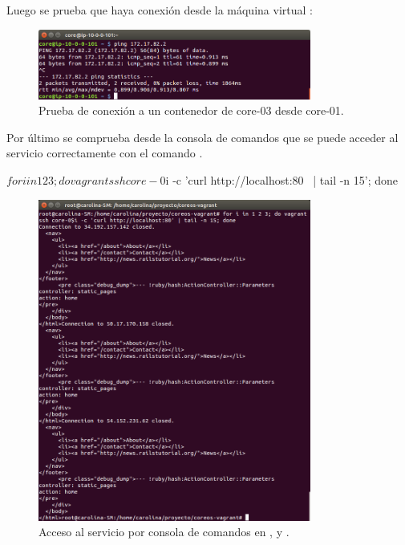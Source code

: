 Luego se prueba que haya conexión desde la máquina virtual :

\begin{figure}[H]
\centering
\includegraphics[width=0.8\textwidth]{images/figures/ping-1.png}
\caption{Prueba de conexión a un contenedor de core-03 desde core-01.}
\end{figure}

Por último se comprueba desde la consola de comandos que se puede acceder al servicio correctamente con el comando . 

\begin{code}
$ for i in 1 2 3; do vagrant ssh core-0$i -c 'curl http://localhost:80 \
  | tail -n 15'; done
\end{code}

\begin{figure}[H]
\centering
\includegraphics[width=0.8\textwidth]{images/figures/curl-aws-3.png}
\caption{Acceso al servicio por consola de comandos en \kode{core-01},  y .}
\end{figure}

